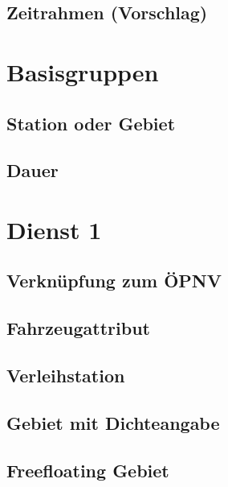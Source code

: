 \subsection*{Zeitrahmen (Vorschlag)}


\section{Basisgruppen}

\subsection*{Station oder Gebiet}


\subsection*{Dauer}


\section{Dienst 1}
\label{subsec:Datenmodell:Dienst1}

\subsection*{Verknüpfung zum ÖPNV}


\subsection*{Fahrzeugattribut}


\subsection*{Verleihstation}



\subsection*{Gebiet mit Dichteangabe}


\subsection*{Freefloating Gebiet}


